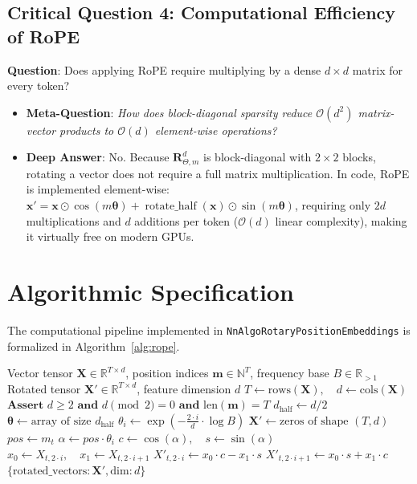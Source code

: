 \documentclass[11pt,a4paper]{article}
\theoremstyle{definition}
\begin{document}
\subsection{\textbf{Critical Question 4: Computational Efficiency of RoPE}}
\textbf{Question}: Does applying RoPE require multiplying by a dense $d \times d$ matrix for every token?
\begin{itemize}
    \item \textbf{Meta-Question}: \emph{How does block-diagonal sparsity reduce $\mathcal{O}(d^2)$ matrix-vector products to $\mathcal{O}(d)$ element-wise operations?}
    \item \textbf{Deep Answer}: No. Because $\mathbf{R}_{\Theta, m}^d$ is block-diagonal with $2 \times 2$ blocks, rotating a vector does not require a full matrix multiplication. In code, RoPE is implemented element-wise:
    $\mathbf{x}' = \mathbf{x} \odot \cos(m\boldsymbol{\theta}) + \operatorname{rotate\_half}(\mathbf{x}) \odot \sin(m\boldsymbol{\theta})$, requiring only $2d$ multiplications and $d$ additions per token ($\mathcal{O}(d)$ linear complexity), making it virtually free on modern GPUs.
\end{itemize}

\section{Algorithmic Specification}

The computational pipeline implemented in \texttt{NnAlgoRotaryPositionEmbeddings} is formalized in Algorithm~\ref{alg:rope}.

\begin{algorithm}[H]
\caption{Rotary Position Embedding Execution}
\label{alg:rope}
\begin{algorithmic}[1]
\Require Vector tensor $\mathbf{X} \in \mathbb{R}^{T \times d}$, position indices $\mathbf{m} \in \mathbb{N}^T$, frequency base $B \in \mathbb{R}_{> 1}$
\Ensure Rotated tensor $\mathbf{X}' \in \mathbb{R}^{T \times d}$, feature dimension $d$
\State $T \gets \text{rows}(\mathbf{X}), \quad d \gets \text{cols}(\mathbf{X})$
\State $\textbf{Assert } d \ge 2 \textbf{ and } d \pmod 2 = 0 \textbf{ and } \text{len}(\mathbf{m}) = T$
\State $d_{\text{half}} \gets d / 2$
\State $\boldsymbol{\theta} \gets \text{array of size } d_{\text{half}}$
    \State $\theta_i \gets \exp\left( -\frac{2 \cdot i}{d} \cdot \log B \right)$
\EndFor
\State $\mathbf{X}' \gets \text{zeros of shape } (T, d)$
    \State $pos \gets m_t$
        \State $\alpha \gets pos \cdot \theta_i$
        \State $c \gets \cos(\alpha), \quad s \gets \sin(\alpha)$
        \State $x_0 \gets X_{t, 2 \cdot i}, \quad x_1 \gets X_{t, 2 \cdot i + 1}$
        \State $X'_{t, 2 \cdot i} \gets x_0 \cdot c - x_1 \cdot s$ 
        \State $X'_{t, 2 \cdot i + 1} \gets x_0 \cdot s + x_1 \cdot c$
    \EndFor
\EndFor
\State \Return $\{\text{rotated\_vectors}: \mathbf{X}', \text{dim}: d\}$
\end{algorithmic}
\end{algorithm}
\end{document}
